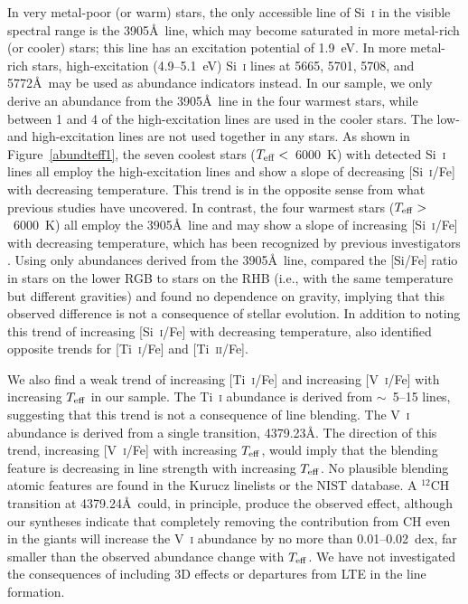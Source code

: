\documentclass{emulateapj}
\begin{document}
In very metal-poor (or warm) stars, the only accessible
line of Si~\textsc{i} in the visible spectral range is the 3905\AA\ line,
which may become saturated in more metal-rich (or cooler) stars;
this line has an excitation potential of 1.9~eV.
In more metal-rich stars, high-excitation (4.9--5.1~eV) Si~\textsc{i}
lines at 5665, 5701, 5708, and 5772\AA\ may be used as abundance
indicators instead.  
In our sample, we only derive an abundance from the 3905\AA\ line
in the four warmest stars,
while between 1 and 4 of the high-excitation lines are used
in the cooler stars.
The low- and high-excitation lines are not used together in any stars.
As shown in Figure~\ref{abundteff1},
the seven coolest stars ($T_{\rm eff} <$~6000~K)
with detected Si~\textsc{i} lines
all employ the high-excitation lines and show
a slope of decreasing [Si~\textsc{i}/Fe] with decreasing temperature.
This trend is in the opposite sense from what previous studies 
have uncovered.
In contrast, the four warmest stars ($T_{\rm eff} >$~6000~K)
all employ the 3905\AA\ line and may show a slope of
increasing [Si~\textsc{i}/Fe] with decreasing temperature,
which has been recognized by previous investigators
\citep{cohen04b,preston06,lai08,bonifacio09}.
Using only abundances derived from the 3905\AA\ line, 
\citet{preston06} compared the [Si/Fe] ratio in stars on the 
lower RGB to stars on the RHB (i.e., with the same temperature but different
gravities) and found no dependence on gravity, implying that this
observed difference is not a consequence of stellar evolution.
In addition to noting this trend of 
increasing [Si~\textsc{i}/Fe] with decreasing temperature,
\citet{lai08} also identified opposite trends for
[Ti~\textsc{i}/Fe] and [Ti~\textsc{ii}/Fe].

We also find a weak trend of increasing [Ti~\textsc{i}/Fe] and 
increasing [V~\textsc{i}/Fe] with increasing $T_{\rm eff}$ in our sample.
The Ti~\textsc{i} abundance is derived from $\sim$~5--15 lines, 
suggesting that this trend is not a consequence of line blending.
The V~\textsc{i} abundance is derived from a single transition, 4379.23\AA.
The direction of this trend, increasing [V~\textsc{i}/Fe] with 
increasing $T_{\rm eff}$, would imply that the blending 
feature is decreasing in line strength with increasing $T_{\rm eff}$.
No plausible blending atomic features are found in the Kurucz linelists
or the NIST database.
A $^{12}$CH transition at 4379.24\AA\ could, in principle, produce
the observed effect, although our syntheses indicate that completely
removing the contribution from CH even in the giants will increase the
V~\textsc{i} abundance by no more than 0.01--0.02~dex, far
smaller than the observed abundance change with $T_{\rm eff}$.
We have not investigated the consequences of including 3D effects
or departures from LTE in the line formation.
\end{document}
